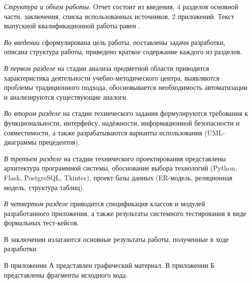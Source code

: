 \emph{Структура и объем работы.} Отчет состоит из введения, 4 разделов основной части, заключения, списка использованных источников, 2 приложений. Текст выпускной квалификационной работы равен .

\emph{Во введении} сформулирована цель работы, поставлены задачи разработки, описана структура работы, приведено краткое содержание каждого из разделов.

\emph{В первом разделе} на стадии анализа предметной области приводится характеристика деятельности учебно-методического центра, выявляются проблемы традиционного подхода, обосновывается необходимость автоматизации и анализируются существующие аналоги.

\emph{Во втором разделе} на стадии технического задания формулируются требования к функциональности, интерфейсу, надёжности, информационной безопасности и совместимости, а также разрабатываются варианты использования (UML-диаграммы прецедентов).

\emph{В третьем разделе} на стадии технического проектирования представлены архитектура программной системы, обоснование выбора технологий (Python, Flask, PostgreSQL, Tkinter), проект базы данных (ER-модель, реляционная модель, структура таблиц).

\emph{В четвертом разделе} приводится спецификация классов и модулей разработанного приложения, а также результаты системного тестирования в виде формальных тест-кейсов.

В заключении излагаются основные результаты работы, полученные в ходе разработки.

В приложении А представлен графический материал.
В приложении Б представлены фрагменты исходного кода.
